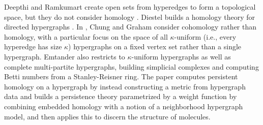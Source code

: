 \documentclass{amsart}
\begin{document}
Deepthi and Ramkumart create open sets from hyperedges to form a topological space, but they do not consider homology \cite{deepthi2021hypergraph}. Diestel builds a homology theory for directed hypergraphs \cite{diestel2020homological}. In \cite{chung1992cohomological}, Chung and Graham consider cohomology rather than homology, with a particular focus on the space of all $\kappa$-uniform (i.e., every hyperedge has size $\kappa$) hypergraphs on a fixed vertex set rather than a single hypergraph. Emtander also restricts to $\kappa$-uniform hypergraphs as well as complete multi-partite hypergraphs, building simplicial complexes and computing Betti numbers from a Stanley-Reisner ring. The paper \cite{nguyen2020community} computes persistent homology on a hypergraph by instead constructing a metric from hypergraph data and \cite{liu2022neighborhood} builds a persistence theory parametrized by a weight function by combining embedded homology with a notion of a neighborhood hypergraph model, and then applies this to discern the structure of molecules.
  
\end{document}
